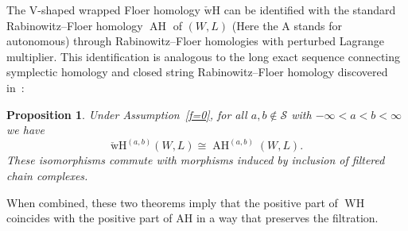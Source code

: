 \documentclass{amsart}
\newcommand{\Scal}{{\mathcal{S}}}
\renewcommand{\TH}{\operatorname{TH}}
\newcommand{\TC}{\operatorname{TC}}
\newcommand{\AH}{\operatorname{AH}}
\newcommand{\WslantH}{\operatorname{WH}}
\newcommand{\WcheckH}{\operatorname{\check wH}}
\newtheorem{theorem}{Theorem}
\newtheorem{proposition}{Proposition}[section]
\theoremstyle{definition}
\theoremstyle{remark}
\numberwithin{equation}{section}
\begin{document}
The V-shaped wrapped Floer homology $\WcheckH$ can be identified with the standard Rabinowitz--Floer homology $\AH$ of $(W,L)$ (Here the A stands for autonomous) through Rabinowitz--Floer homologies with perturbed Lagrange multiplier. This identification is analogous to the long exact sequence connecting symplectic homology and closed string Rabinowitz--Floer homology discovered in~\cite{CFO10}:

\begin{proposition}\label{alrfhvwh}
	Under Assumption~\ref{f=0}, for all $a,b\notin\Scal$ with $-\infty<a<b<\infty$ we have
	\begin{equation*}
		\WcheckH^{(a,b)}(W,L)\cong \AH^{(a,b)}(W,L).
	\end{equation*}
	These isomorphisms commute with morphisms induced by inclusion of filtered chain complexes.
\end{proposition}
When combined, these two theorems imply that the positive part of $\WslantH$ coincides with the positive part of AH in a way that preserves the filtration.

%
\end{document}
